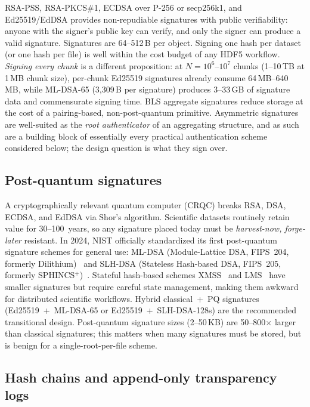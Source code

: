 \documentclass[11pt]{article}
\begin{document}
RSA-PSS, RSA-PKCS\#1, ECDSA over P-256 or secp256k1, and Ed25519/EdDSA
\cite{rfc8032} provides non-repudiable signatures with public verifiability:
anyone with the signer's public key can verify, and only the signer can
produce a valid signature. Signatures are 64--512\,B per object. Signing one
hash per dataset (or one hash per file) is well within the cost budget of any
HDF5 workflow. \emph{Signing every chunk} is a different proposition: at
$N=10^6$--$10^7$ chunks (1--10\,TB at 1\,MB chunk size), per-chunk Ed25519
signatures already consume 64\,MB--640\,MB, while ML-DSA-65 (3{,}309\,B per
signature) produces 3--33\,GB of signature data and commensurate signing time. BLS aggregate signatures reduce storage at the
cost of a pairing-based, non-post-quantum primitive. Asymmetric signatures
are well-suited as the \emph{root authenticator} of an aggregating structure,
and as such are a building block of essentially every practical authentication
scheme considered below; the design question is what they sign over.

\subsection{Post-quantum signatures}

A cryptographically relevant quantum computer (CRQC) breaks RSA, DSA, ECDSA,
and EdDSA via Shor's algorithm. Scientific datasets routinely retain value for
30--100~years, so any signature placed today must be \emph{harvest-now,
forge-later} resistant. In 2024, NIST officially standardized its first
post-quantum signature schemes for general use: ML-DSA (Module-Lattice DSA,
FIPS~204, formerly Dilithium)~\cite{fips204} and SLH-DSA (Stateless Hash-based
DSA, FIPS~205, formerly SPHINCS$^+$)~\cite{fips205}. Stateful hash-based schemes XMSS~\cite{rfc8391}
and LMS~\cite{rfc8554} have smaller signatures but require careful state
management, making them awkward for distributed scientific workflows. Hybrid
classical~+~PQ signatures (Ed25519~+~ML-DSA-65 or Ed25519~+~SLH-DSA-128s) are
the recommended transitional design. Post-quantum signature sizes
(2--50\,KB) are 50--800$\times$ larger than classical signatures; this
matters when many signatures must be stored, but is benign for a
single-root-per-file scheme.

\subsection{Hash chains and append-only transparency logs}
\end{document}
